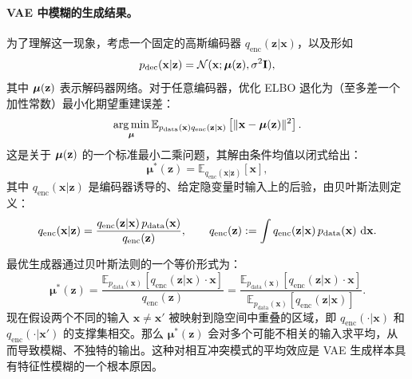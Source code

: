 \paragraph{VAE 中模糊的生成结果。}
为了理解这一现象，考虑一个固定的高斯编码器 $ q_{\text{enc}}(\mathbf{z}|\mathbf{x}) $，以及形如
\[
p_{\text{dec}}(\mathbf{x}|\mathbf{z}) = \mathcal{N}(\mathbf{x}; \bm{\mu}({\mathbf{z}}), \sigma^2 {\mathbf{I}}),
\]
其中 $ \bm{\mu}({\mathbf{z}}) $ 表示解码器网络。对于任意编码器，优化 ELBO 退化为（至多差一个加性常数）最小化期望重建误差：
\[
\operatorname*{arg\,min}_{\bm{\mu}} \mathbb{E}_{p_{\text{data}}(\mathbf{x})q_{\text{enc}}(\mathbf{z}|\mathbf{x})} \left[ \| \mathbf{x} - \bm{\mu}({\mathbf{z}}) \|^2 \right].
\]
这是关于 $ \bm{\mu}({\mathbf{z}}) $ 的一个标准最小二乘问题，其解由条件均值以闭式给出：
\[
\bm{\mu}^*(\mathbf{z}) = \mathbb{E}_{q_{\text{enc}}(\mathbf{x}|\mathbf{z})}[\mathbf{x}],
\]
其中 $ q_{\text{enc}}(\mathbf{x}|\mathbf{z}) $ 是编码器诱导的、给定隐变量时输入上的后验，由贝叶斯法则定义：
\[
q_{\text{enc}}(\mathbf{x}|\mathbf{z})
=
\frac{q_{\text{enc}}(\mathbf{z}|\mathbf{x})\, p_{\text{data}}(\mathbf{x})}{q_{\text{enc}}(\mathbf{z})},
\qquad
q_{\text{enc}}(\mathbf{z})
:=
\int q_{\text{enc}}(\mathbf{z}|\mathbf{x})\, p_{\text{data}}(\mathbf{x})\, \mathop{}\!\mathrm{d} \mathbf{x}.
\]

最优生成器通过贝叶斯法则的一个等价形式为：
\[
\bm{\mu}^*(\mathbf{z})
=
\frac{\mathbb{E}_{p_{\text{data}}(\mathbf{x})}\!\left[q_{\text{enc}}(\mathbf{z}|\mathbf{x}) \cdot \mathbf{x}\right]}
{q_{\text{enc}}(\mathbf{z})}
=
\frac{\mathbb{E}_{p_{\text{data}}(\mathbf{x})}\!\left[q_{\text{enc}}(\mathbf{z}|\mathbf{x}) \cdot \mathbf{x}\right]}
{\mathbb{E}_{p_{\text{data}}(\mathbf{x})}\!\left[q_{\text{enc}}(\mathbf{z}|\mathbf{x})\right]}.
\]
现在假设两个不同的输入 $ \mathbf{x} \neq \mathbf{x}' $ 被映射到隐空间中重叠的区域，即 $ q_{\text{enc}}(\cdot|\mathbf{x}) $ 和 $ q_{\text{enc}}(\cdot|\mathbf{x}') $ 的支撑集相交。那么 $\bm{\mu}^*(\mathbf{z})$ 会对多个可能不相关的输入求平均，从而导致模糊、不独特的输出。这种对相互冲突模式的平均效应是 VAE 生成样本具有特征性模糊的一个根本原因。




\newpage

